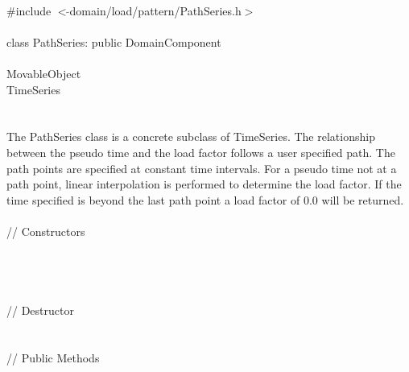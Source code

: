 
   \\
\indent \#include $<\tilde{ }$domain/load/pattern/PathSeries.h$>$  \\

  \\
\indent class PathSeries: public DomainComponent  \\

 \\
\indent MovableObject \\
\indent\indent TimeSeries \\
\indent\indent{} \\

 \\ 
\indent The PathSeries class is a concrete subclass of TimeSeries.
The relationship between the pseudo time and the load factor follows
a user specified path. The path points are specified at constant time
intervals. For a pseudo time not at a path point, linear interpolation
is performed to determine the load factor. If the time specified is
beyond the last path point a load factor of $0.0$ will be returned.\\

 \\
\indent // Constructors \\ 
\\ 
\\ 
\\ \\
\indent // Destructor \\ 
\\  \\
\indent // Public Methods \\ 
\\
\\
\\
\\

